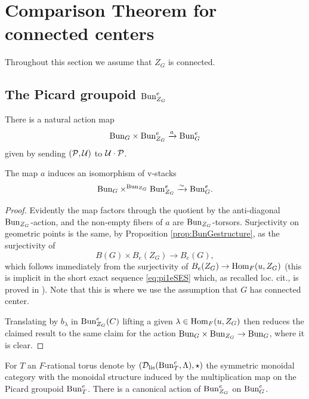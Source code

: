 

\section{Comparison Theorem for connected centers}\label{sec:reduction-theorem}
Throughout this section we assume that $Z_{G}$ is connected.

\subsection{The Picard groupoid $\mathrm{Bun}_{Z_{G}}^{e}$}
There is a natural action map 
\begin{equation*}
    \mathrm{Bun}_{G} \times \mathrm{Bun}_{Z_{G}}^{e} \xrightarrow{a} \mathrm{Bun}_{G}^{e}
\end{equation*}
given by sending $(\mathcal{P},\mathcal{U})$ to $\mathcal{U} \cdot \mathcal{P}$.
\begin{prop}\label{prop:quotient-groupoid-by-center}
    The map $a$ induces an isomorphism of v-stacks
    \begin{equation*}
        \mathrm{Bun}_{G} \times^{\mathrm{Bun}_{Z_{G}}} \mathrm{Bun}_{Z_{G}}^{e} \xrightarrow{\sim} \mathrm{Bun}_{G}^{e}.
    \end{equation*}
\end{prop}

\begin{proof}
   Evidently the map factors through the quotient by the anti-diagonal $\mathrm{Bun}_{Z_{G}}$-action, and the non-empty fibers of $a$ are $\mathrm{Bun}_{Z_{G}}$-torsors. Surjectivity on geometric points is the same, by Proposition \ref{prop:BunGestructure}, as the surjectivity of
   \begin{equation*}
       B(G) \times B_{e}(Z_{G}) \to B_{e}(G),
   \end{equation*}
   which follows immediately from the surjectivity of $B_{e}(Z_{G}) \to \mathrm{Hom}_{F}(u,Z_{G})$ (this is implicit in the short exact sequence \eqref{eq:pi1eSES} which, as recalled loc. cit., is proved in \cite[\S 9]{Fargues22}). Note that this is where we use the assumption that $G$ has connected center.
   
   Translating by $b_{\lambda}$ in $\mathrm{Bun}_{Z_{G}}^{e}(C)$ lifting a given $\lambda \in \mathrm{Hom}_{F}(u,Z_{G})$ then reduces the claimed result to the same claim for the action $\mathrm{Bun}_{G} \times \mathrm{Bun}_{Z_{G}} \to \mathrm{Bun}_{G}$, where it is clear.
\end{proof}

For $T$ an $F$-rational torus denote by $(\mathcal{D}_{\textnormal{lis}}(\mathrm{Bun}_{T}^{e},\Lambda),\star)$ the symmetric monoidal category with the monoidal structure induced by the multiplication map on the Picard groupoid $\mathrm{Bun}_{T}^{e}$. There is a canonical action of $\mathrm{Bun}_{Z_G}^e$ on $\mathrm{Bun}_G^e$.

